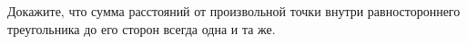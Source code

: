 \begin{ex}
	\begin{condition}
		Докажите, что сумма расстояний от произвольной точки внутри равностороннего треугольника до его сторон всегда одна и та же.
	\end{condition}
\end{ex}